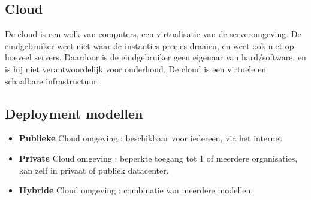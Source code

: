 \documentclass{report}
\begin{document}
   			\subsection{Cloud}
   				De cloud is een wolk van computers, een virtualisatie van de serveromgeving. De eindgebruiker weet niet waar de instanties precies draaien, en weet ook niet op hoeveel servers. Daardoor is de eindgebruiker geen eigenaar van hard/software, en is hij niet verantwoordelijk voor onderhoud. De cloud is een virtuele en schaalbare infrastructuur. 
   			\subsection{Deployment modellen}
   				\begin{itemize}
   					\item \textbf{Publieke} Cloud omgeving : beschikbaar voor iedereen, via het internet
   					\item \textbf{Private} Cloud omgeving : beperkte toegang tot 1 of meerdere organisaties, kan zelf in privaat of publiek datacenter.
   					\item \textbf{Hybride} Cloud omgeving : combinatie van meerdere modellen.
   				\end{itemize}
   		
   				
   				
   			
   		
  	 				
  	 		
\end{document}
